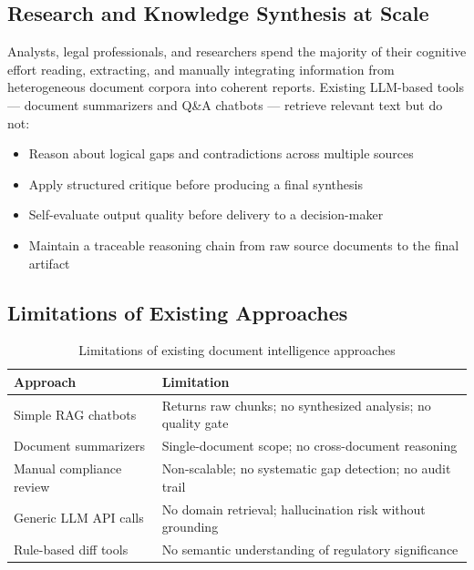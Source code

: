 \documentclass[12pt,letterpaper]{article}
\begin{document}
\subsection{Research and Knowledge Synthesis at Scale}

Analysts, legal professionals, and researchers spend the majority of their cognitive effort
reading, extracting, and manually integrating information from heterogeneous document
corpora into coherent reports. Existing LLM-based tools --- document summarizers and Q\&A
chatbots --- retrieve relevant text but do not:
\begin{itemize}[leftmargin=1.5em]
  \item Reason about logical gaps and contradictions across multiple sources
  \item Apply structured critique before producing a final synthesis
  \item Self-evaluate output quality before delivery to a decision-maker
  \item Maintain a traceable reasoning chain from raw source documents to the final artifact
\end{itemize}

\subsection{Limitations of Existing Approaches}

\begin{table}[h!]
\centering
\begin{tabular}{L{4.5cm} L{9.5cm}}
\toprule
\textbf{Approach} & \textbf{Limitation} \\
\midrule
Simple RAG chatbots        & Returns raw chunks; no synthesized analysis; no quality gate \\
Document summarizers       & Single-document scope; no cross-document reasoning \\
Manual compliance review   & Non-scalable; no systematic gap detection; no audit trail \\
Generic LLM API calls      & No domain retrieval; hallucination risk without grounding \\
Rule-based diff tools      & No semantic understanding of regulatory significance \\
\bottomrule
\end{tabular}
\caption{Limitations of existing document intelligence approaches}
\end{table}

\end{document}
